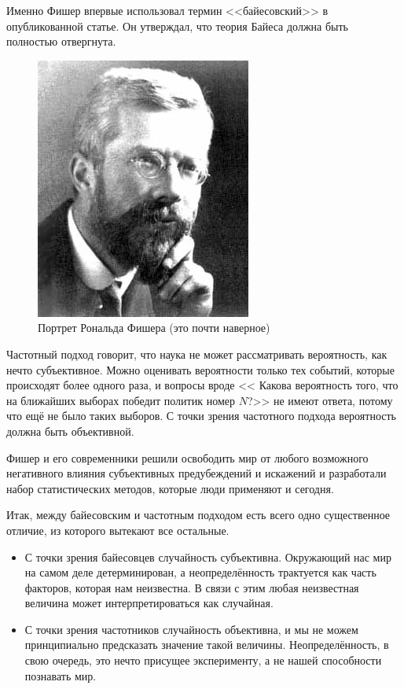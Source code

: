 Именно Фишер впервые использовал термин <<байесовский>> в опубликованной статье. Он утверждал, что теория Байеса должна быть полностью отвергнута. 
\begin{figure}
	\centering \includegraphics[width=0.8\linewidth]{images/Fischer.jpg}
	\caption{Портрет Рональда Фишера (это почти наверное)}
\end{figure} 
Частотный подход говорит, что наука не может рассматривать вероятность, как нечто субъективное. Можно оценивать вероятности только тех событий, которые происходят более одного раза, и вопросы вроде << Какова вероятность того, что на ближайших выборах победит политик номер $N$?>> не имеют ответа, потому что ещё не было таких выборов. С точки зрения частотного подхода вероятность должна быть объективной.

Фишер и его современники решили освободить мир от любого возможного негативного влияния субъективных предубеждений и искажений и разработали набор статистических методов, которые люди применяют и сегодня.

Итак, между байесовским и частотным подходом есть всего одно существенное отличие, из которого вытекают все остальные.

\begin{itemize}
\item С точки зрения байесовцев случайность субъективна. Окружающий нас мир на самом деле детерминирован, а неопределённость трактуется как часть факторов, которая нам неизвестна. В связи с этим любая неизвестная величина может интерпретироваться как случайная.

\item С точки зрения частотников случайность объективна, и мы не можем принципиально предсказать значение такой величины. Неопределённость, в свою очередь, это нечто присущее эксперименту, а не нашей способности познавать мир.
\end{itemize}

